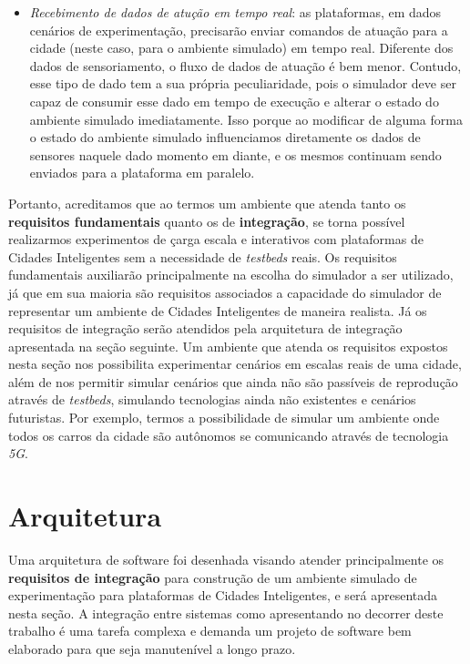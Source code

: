 \begin{itemize}
    \item \textit{Recebimento de dados de atução em tempo real}: as plataformas, em dados cenários de experimentação, precisarão enviar comandos de atuação para a cidade (neste caso,
        para o ambiente simulado) em tempo real.
        Diferente dos dados de sensoriamento, o fluxo de dados de atuação é bem menor.
        Contudo, esse tipo de dado tem a sua própria peculiaridade, pois o simulador deve ser capaz de consumir esse dado em tempo de execução e alterar o estado do ambiente simulado
        imediatamente.
        Isso porque ao modificar de alguma forma o estado do ambiente simulado influenciamos diretamente os dados de sensores naquele dado momento em diante, e os mesmos continuam
        sendo enviados para a plataforma em paralelo.
\end{itemize}

Portanto, acreditamos que ao termos um ambiente que atenda tanto os \textbf{requisitos fundamentais} quanto os de \textbf{integração}, se torna possível realizarmos experimentos
de çarga escala e interativos com plataformas de Cidades Inteligentes sem a necessidade de \textit{testbeds} reais.
Os requisitos fundamentais auxiliarão principalmente na escolha do simulador a ser utilizado, já que em sua maioria são requisitos associados a capacidade do simulador de representar um ambiente
de Cidades Inteligentes de maneira realista.
Já os requisitos de integração serão atendidos pela arquitetura de integração apresentada na seção seguinte.
Um ambiente que atenda os requisitos expostos nesta seção nos possibilita experimentar cenários em escalas reais de uma cidade, além de nos permitir simular cenários que ainda não são passíveis de
reprodução através de \textit{testbeds}, simulando tecnologias ainda não existentes e cenários futuristas.
Por exemplo, termos a possibilidade de simular um ambiente onde todos os carros da cidade são autônomos se comunicando através de tecnologia \textit{5G}.

\section{Arquitetura}

Uma arquitetura de software foi desenhada visando atender principalmente os \textbf{requisitos de integração} para construção de um ambiente simulado de experimentação para plataformas
de Cidades Inteligentes, e será apresentada nesta seção.
A integração entre sistemas como apresentando no decorrer deste trabalho é uma tarefa complexa e demanda um projeto de software bem elaborado para que seja manutenível a longo prazo.

